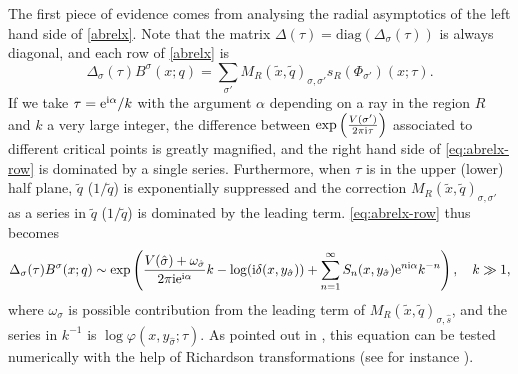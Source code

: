 \documentclass[12pt,reqno]{amsart}
\theoremstyle{definition}
\def\s{\sigma}
\def\tq{\tilde{q}}
\def\tx{\tilde{x}}
\def\ri{\mathrm{i}}
\def\tx{\tilde{x}}
\def\re{{\rm e}}
\def\ri{{\rm i}}
\def\diag{\mathrm{diag}}
\begin{document}
The first piece of evidence comes from analysing the radial
asymptotics of the left hand side of \eqref{abrelx}.  Note that the
matrix $\Delta(\tau) = \diag(\Delta_\s(\tau))$ is always diagonal, and
each row of \eqref{abrelx} is
\begin{equation}
  \Delta_{\s}(\tau)B^\s(x;q) =
  \sum_{\s'} M_R(\tx,\tq)_{\s,\s'}s_R(\Phi_{\s'})(x;\tau).
  \label{eq:abrelx-row}
\end{equation}
If we take $\tau = \re^{\ri\alpha}/k$ with the argument $\alpha$
depending on a ray in the region $R$ and $k$ a very large integer, the
difference between $\exp\left(\frac{V(\s')}{2\pi\ri\tau}\right)$
associated to different critical points is greatly magnified, and the
right hand side of \eqref{eq:abrelx-row} is dominated by a single
series.  Furthermore, when $\tau$ is in the upper (lower) half plane,
$\tq$ ($1/\tq$) is exponentially suppressed and the correction
$M_R(\tx,\tq)_{\s,\s'}$ as a series in $\tq$ ($1/\tq$) is dominated by
the leading term. \eqref{eq:abrelx-row} thus becomes
\begin{equation}
  \Delta_\s(\tau) B^\s(x;q) \sim
  \exp\left(\frac{V(\hat{\s}) + \omega_{\hat{\s}}}{2\pi\ri\re^{\ri\alpha}}k
    - \log (\ri \delta(x,y_{\hat{\s}}))
    + \sum_{n=1}^\infty S_n(x,y_{\hat{\s}})\re^{n \ri
      \alpha}k^{-n}\right),\quad k\gg 1,
\end{equation}
where $\omega_{\hat{\s}}$ is possible contribution from the leading
term of $M_R(\tx,\tq)_{\s,\hat{s}}$, and the series in $k^{-1}$ is
$\log\varphi(x,y_{\hat{\s}};\tau)$.  As pointed out in
\cite{GZ:qseries}, this equation can be tested numerically with the
help of Richardson transformations (see for instance
\cite{bender-orszag}).
\end{document}
